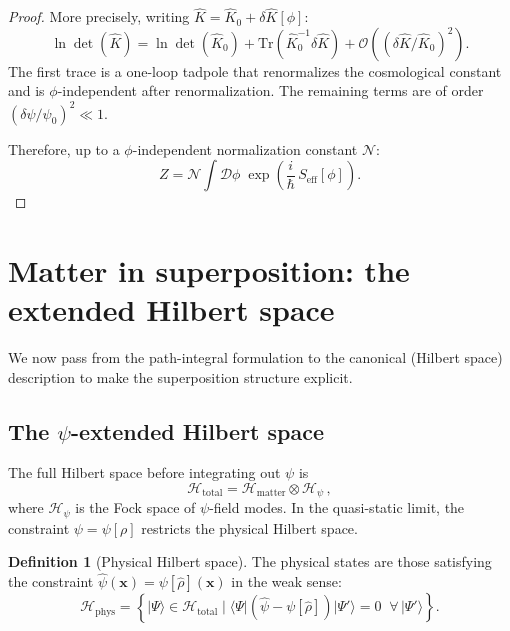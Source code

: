 \documentclass[12pt,a4paper]{article}
\theoremstyle{definition}
\newtheorem{definition}[theorem]{Definition}
\theoremstyle{remark}
\newcommand{\hbar}{\hslash}
\newcommand{\Tr}{\mathrm{Tr}}
\newcommand{\Dpath}{\mathcal{D}}
\newcommand{\order}{\mathcal{O}}
\newcommand{\Hilb}{\mathcal{H}}
\begin{document}
\begin{proof}
More precisely, writing $\hat{K} = \hat{K}_0 + \delta\hat{K}[\phi]$:
\begin{equation}
\ln\det(\hat{K}) = \ln\det(\hat{K}_0) + \Tr(\hat{K}_0^{-1}\delta\hat{K})
+ \order\!\left((\delta\hat{K}/\hat{K}_0)^2\right).
\end{equation}
The first trace is a one-loop tadpole that renormalizes the cosmological
constant and is $\phi$-independent after renormalization.  The remaining
terms are of order $(\delta\psi/\psi_0)^2 \ll 1$.

Therefore, up to a $\phi$-independent normalization constant $\mathcal{N}$:
\begin{equation}
Z = \mathcal{N}\int \Dpath\phi\;
\exp\!\left(\frac{i}{\hbar}\,S_{\mathrm{eff}}[\phi]\right).
\end{equation}
\end{proof}

\section{Matter in superposition: the extended Hilbert space}
\label{sec:superposition}

We now pass from the path-integral formulation to the canonical (Hilbert space)
description to make the superposition structure explicit.

\subsection{The $\psi$-extended Hilbert space}

The full Hilbert space before integrating out $\psi$ is
\begin{equation}
\Hilb_{\mathrm{total}} = \Hilb_{\mathrm{matter}} \otimes \Hilb_\psi\,,
\end{equation}
where $\Hilb_\psi$ is the Fock space of $\psi$-field modes.  In the
quasi-static limit, the constraint $\psi = \psi[\rho]$ restricts the
physical Hilbert space.

\begin{definition}[Physical Hilbert space]
The physical states are those satisfying the constraint
$\hat{\psi}(\mathbf{x}) = \psi[\hat{\rho}](\mathbf{x})$ in the weak sense:
\begin{equation}
\Hilb_{\mathrm{phys}} = \left\{|\Psi\rangle \in \Hilb_{\mathrm{total}}
\;\Big|\; \langle\Psi| \left(\hat{\psi} - \psi[\hat{\rho}]\right)|\Psi'\rangle = 0
\;\;\forall\,|\Psi'\rangle\right\}.
\end{equation}
\end{definition}
\end{document}
